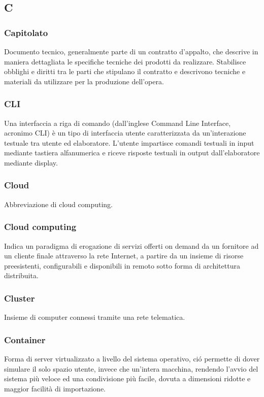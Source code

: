\subsection*{\textbf{\hfill \Huge{C} \hfill}} 
\subsubsection*{Capitolato}
Documento tecnico, generalmente parte di un contratto d'appalto, che descrive in maniera dettagliata le specifiche tecniche dei prodotti da realizzare. Stabilisce obblighi e diritti tra le parti che stipulano il contratto e descrivono tecniche e materiali da utilizzare per la produzione dell'opera. 

\subsubsection*{CLI}
Una interfaccia a riga di comando (dall'inglese Command Line Interface, acronimo CLI) è un tipo di interfaccia utente caratterizzata da un'interazione testuale tra utente ed elaboratore. L'utente impartisce comandi testuali in input mediante tastiera alfanumerica e riceve risposte testuali in output dall'elaboratore mediante display.

\subsubsection*{Cloud}
Abbreviazione di cloud computing\glos.

\subsubsection*{Cloud computing}
Indica un paradigma di erogazione di servizi offerti on demand da un fornitore ad un cliente finale attraverso la rete Internet, a partire da un insieme di risorse preesistenti, configurabili e disponibili in remoto sotto forma di architettura distribuita.

\subsubsection*{Cluster}
Insieme di computer connessi tramite una rete telematica.

\subsubsection*{Container}
Forma di server virtualizzato a livello del sistema operativo, ció permette di dover simulare il solo spazio utente, invece che un'intera macchina, rendendo l'avvio del sistema più veloce ed una condivisione più facile, dovuta a dimensioni ridotte e maggior facilità di importazione. 

